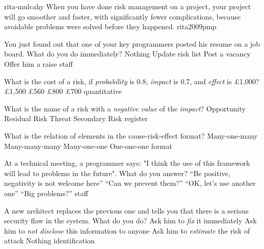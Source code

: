 \documentclass{article}
\begin{document}

\lnQuote
  {rita-mulcahy}
  {When you have done risk management on a project, your project will go smoother and faster, with significantly fewer complications, because avoidable problems were solved before they happened.}
  {rita2009pmp}


\pmbaQuestion
  {You just found out that one of your key programmers posted his resume on a job board. What do you do immediately?}
  {Nothing}
  {Update risk list}
  {Post a vacancy}
  {Offer him a raise}
  {staff}

\pmbaQuestion
  {What is the cost of a risk, if \emph{probability} is 0.8, \emph{impact} is 0.7, and \emph{effect} is \pounds1,000?}
  {\pounds1,500}
  {\pounds560}
  {\pounds800}
  {\pounds700}
  {quantitative}

\pmbaQuestion
  {What is the name of a risk with a \emph{negative value} of the \emph{impact}?}
  {Opportunity}
  {Residual Risk}
  {Threat}
  {Secondary Risk}
  {register}

\pmbaQuestion
  {What is the relation of elements in the cause-risk-effect format?}
  {Many-one-many}
  {Many-many-many}
  {Many-one-one}
  {One-one-one}
  {format}

\pmbaQuestion
  {At a technical meeting, a programmer says: "I think the use of this framework will lead to problems in the future". What do you answer?}
  {``Be positive, negativity is not welcome here''} %
  {``Can we prevent them?''} %
  {``OK, let's use another one''} %
  {``Big problems?''} %
  {staff}

\pmbaQuestion
  {A new architect replaces the previous one and tells you that there is a serious security flaw in the system. What do you do?}
  {Ask him to \emph{fix} it immediately}
  {Ask him to \emph{not disclose} this information to anyone}
  {Ask him to \emph{estimate} the risk of attack}
  {Nothing}
  {identification}
\end{document}

